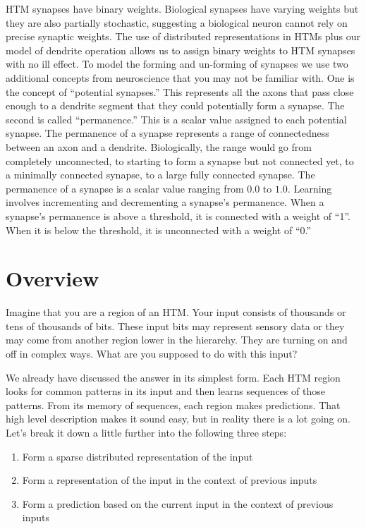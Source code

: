\documentclass{report}
\begin{document}
HTM synapses have binary weights. Biological synapses have varying
weights but they are also partially stochastic, suggesting a
biological neuron cannot rely on precise synaptic weights. The use of
distributed representations in HTMs plus our model of dendrite
operation allows us to assign binary weights to HTM synapses with no
ill effect. To model the forming and un-forming of synapses we use two
additional concepts from neuroscience that you may not be familiar
with. One is the concept of ``potential synapses.'' This represents
all the axons that pass close enough to a dendrite segment that they
could potentially form a synapse. The second is called ``permanence.''
This is a scalar value assigned to each potential synapse. The
permanence of a synapse represents a range of connectedness between an
axon and a dendrite. Biologically, the range would go from completely
unconnected, to starting to form a synapse but not connected yet, to a
minimally connected synapse, to a large fully connected synapse. The
permanence of a synapse is a scalar value ranging from $0.0$ to
$1.0$. Learning involves incrementing and decrementing a synapse's
permanence. When a synapse's permanence is above a threshold, it is
connected with a weight of ``1''. When it is below the threshold, it
is unconnected with a weight of ``0.''

\section*{Overview}

Imagine that you are a region of an HTM. Your input consists of
thousands or tens of thousands of bits. These input bits may represent
sensory data or they may come from another region lower in the
hierarchy. They are turning on and off in complex ways. What are you
supposed to do with this input?

We already have discussed the answer in its simplest form. Each HTM
region looks for common patterns in its input and then learns
sequences of those patterns. From its memory of sequences, each region
makes predictions. That high level description makes it sound easy,
but in reality there is a lot going on. Let's break it down a little
further into the following three steps:

\begin{enumerate}
\item Form a sparse distributed representation of the input
\item Form a representation of the input in the context of previous
  inputs
\item Form a prediction based on the current input in the context of
  previous inputs
\end{enumerate}
\end{document}

